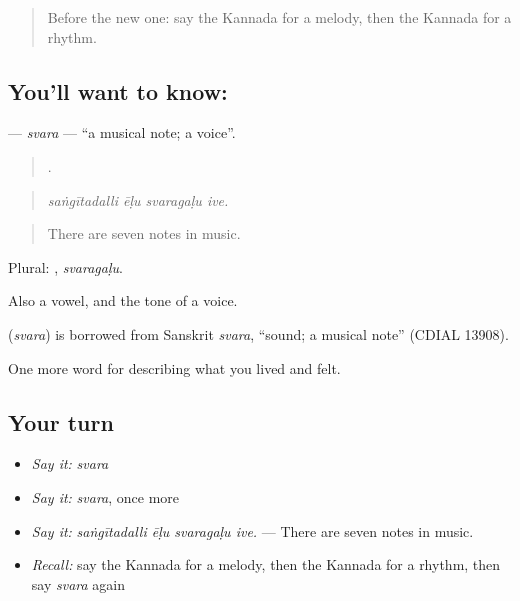 \begin{quote}
Before the new one: say the Kannada for a melody, then the Kannada for a rhythm.
\end{quote}

\subsection*{You'll want to know: }
\textbf{} — \emph{svara} — \textquotedblleft{}a musical note; a voice\textquotedblright{}.

\begin{quote}
   .
\end{quote}

\begin{quote}
\emph{saṅgītadalli ēḷu svaragaḷu ive.}
\end{quote}

\begin{quote}
There are seven notes in music.
\end{quote}

Plural: , \emph{svaragaḷu}.

Also a vowel, and the tone of a voice.

\begin{cousinweb}
\textbf{} (\emph{svara}) is borrowed from Sanskrit \emph{svara}, \textquotedblleft{}sound; a musical note\textquotedblright{} (CDIAL 13908).
\end{cousinweb}

\begin{grammarlens}[title={What you've built}]
One more word for describing what you lived and felt.
\end{grammarlens}

\subsection*{Your turn}
\begin{itemize}
\raggedright
  \item \emph{Say it:} \emph{svara}
  \item \emph{Say it:} \emph{svara}, once more
  \item \emph{Say it:} \emph{saṅgītadalli ēḷu svaragaḷu ive.} — There are seven notes in music.
  \item \emph{Recall:} say the Kannada for a melody, then the Kannada for a rhythm, then say \emph{svara} again
\end{itemize}


